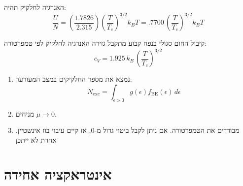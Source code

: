\documentclass{tstextbook}
\begin{document}
\begin{corollary}
האנרגיה לחלקיק תהיה:
$${\frac{U}{N}}=\left({\frac{1.7826}{2.315}}\right)\left({\frac{T}{T_c}}\right)^{3/2}k_{B}T=.7700\,\left({\frac{T}{T_c}}\right)^{3/2}k_{B}T$$

\end{corollary}
\begin{corollary}
קיבול החום סגולי בנפח קבוע מתקבל גזירה האנרגיה לחלקיק לפי טמפרטורה:
$$c_{V}=1.925\,k_{B}\,\left(\frac{T}{T_c}\right)^{3/2}$$

\end{corollary}
\begin{proposition}
  \begin{enumerate}
    \item נמצא את מספר החלקיקים במצב המעורער: 
$$N_{\mathrm{exc}}=\int_{\epsilon>0}g(\epsilon)f_{\mathrm{BE}}(\epsilon)\,d\epsilon$$


    \item מניחים \(\mu\to 0\).  


    \item מבודדים את הטמפרטורה. אם ניתן לקבל ביטוי גדול מ-0, אז קיים עיבוי בוז אינשטיין. אחרת לא ייתכן 


  \end{enumerate}
\end{proposition}
\begin{example}
\end{example}

\section{אינטראקציה אחידה}
\end{document}
